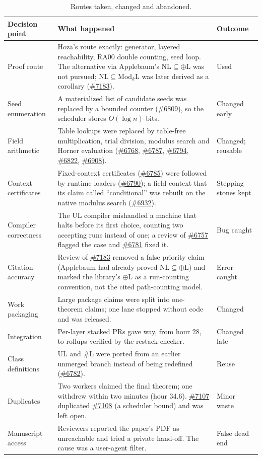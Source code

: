 \documentclass[11pt]{article}
\newcommand{\pr}[1]{\href{https://github.com/cslib-community/cslib-frontier/pull/#1}{\##1}}
\begin{document}
\begin{table}[!htbp]
\centering\small
\begin{tabularx}{\textwidth}{@{}>{\raggedright\arraybackslash}p{3.0cm}L >{\raggedright\arraybackslash}p{2.1cm}@{}}
\toprule
Decision point & What happened & Outcome\\
\midrule
Proof route & Hoza's route exactly: generator, layered reachability, RA00 double counting, seed loop. The alternative via Applebaum's NL$\subseteq\oplus$L was not pursued; NL$\subseteq$Mod$_k$L was later derived as a corollary (\pr{7183}). & Used\\
Seed enumeration & A materialized list of candidate seeds was replaced by a bounded counter (\pr{6809}), so the scheduler stores $O(\log n)$ bits. & Changed early\\
Field arithmetic & Table lookups were replaced by table-free multiplication, trial division, modulus search and Horner evaluation (\pr{6768}, \pr{6787}, \pr{6794}, \pr{6822}, \pr{6908}). & Changed; reusable\\
Context certificates & Fixed-context certificates (\pr{6785}) were followed by runtime loaders (\pr{6790}); a field context that its claim called ``conditional'' was rebuilt on the native modulus search (\pr{6932}). & Stepping stones kept\\
Compiler correctness & The UL compiler mishandled a machine that halts before its first choice, counting two accepting runs instead of one; a review of \pr{6757} flagged the case and \pr{6781} fixed it. & Bug caught\\
Citation accuracy & Review of \pr{7183} removed a false priority claim (Applebaum had already proved NL$\subseteq\oplus$L) and marked the library's $\oplus$L as a run-counting convention, not the cited path-counting model. & Error caught\\
Work packaging & Large package claims were split into one-theorem claims; one lane stopped without code and was released. & Changed\\
Integration & Per-layer stacked PRs gave way, from hour 28, to rollups verified by the restack checker. & Changed late\\
Class definitions & UL and \#L were ported from an earlier unmerged branch instead of being redefined (\pr{6782}). & Reuse\\
Duplicates & Two workers claimed the final theorem; one withdrew within two minutes (hour 34.6). \pr{7107} duplicated \pr{7108} (a scheduler bound) and was left open. & Minor waste\\
Manuscript access & Reviewers reported the paper's PDF as unreachable and tried a private hand-off. The cause was a user-agent filter. & False dead end\\
\bottomrule
\end{tabularx}
\caption{Routes taken, changed and abandoned.}
\label{tab:routes}
\end{table}
\end{document}
